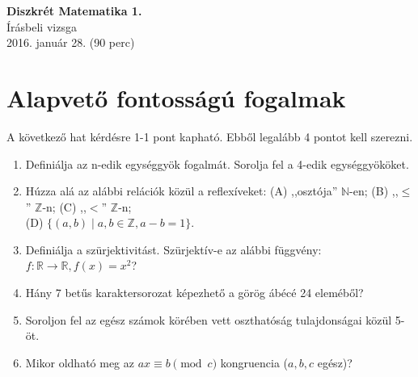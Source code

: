 \documentclass[11pt,a4paper]{article}
\begin{document}
\thispagestyle{empty}

\begin{center}
\begin{large}
\textbf{Diszkrét Matematika 1.}\\
Írásbeli vizsga\\
2016. január 28. (90 perc)
\end{large}
\end{center}

\section{Alapvető fontosságú fogalmak}
A következő hat kérdésre 1-1 pont kapható. Ebből legalább 4 pontot kell szerezni.
\begin{enumerate}\setlength{\itemsep}{3cm}

\item Definiálja az n-edik egységgyök fogalmát. Sorolja fel a 4-edik egységgyököket.
\item Húzza alá az alábbi relációk közül a reflexíveket: (A) ,,osztója'' $\mathbb{N}$-en; (B) ,,$\leq$''  $\mathbb{Z}$-n; (C) ,,$<$''  $\mathbb{Z}$-n; \\(D) $\{(a,b)\mid a,b\in\mathbb{Z}, a-b = 1\}$.
\item Definiálja a szürjektivitást. Szürjektív-e az alábbi függvény: $f\colon \mathbb{R}\to \mathbb{R}, f(x) = x^2$?
\item Hány 7 betűs karaktersorozat képezhető a görög ábécé 24 eleméből?
\item Soroljon fel az egész számok körében vett oszthatóság tulajdonságai közül 5-öt.
\item Mikor oldható meg az $ax\equiv b \pmod c$ kongruencia ($a, b, c$ egész)?
\end{enumerate}

\newpage
\end{document}
